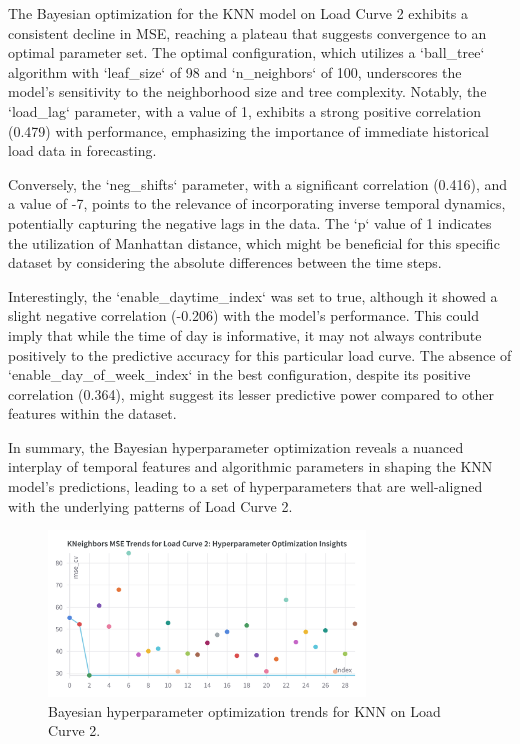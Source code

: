 \documentclass{article} %
\begin{document}
The Bayesian optimization for the \gls{KNN} model on Load Curve 2 exhibits a consistent decline in \gls{MSE}, reaching a plateau that suggests convergence to an optimal parameter set. The optimal configuration, which utilizes a `ball\_tree` algorithm with `leaf\_size` of 98 and `n\_neighbors` of 100, underscores the model's sensitivity to the neighborhood size and tree complexity. Notably, the `load\_lag` parameter, with a value of 1, exhibits a strong positive correlation (0.479) with performance, emphasizing the importance of immediate historical load data in forecasting.

Conversely, the `neg\_shifts` parameter, with a significant correlation (0.416), and a value of -7, points to the relevance of incorporating inverse temporal dynamics, potentially capturing the negative lags in the data. The `p` value of 1 indicates the utilization of Manhattan distance, which might be beneficial for this specific dataset by considering the absolute differences between the time steps.

Interestingly, the `enable\_daytime\_index` was set to true, although it showed a slight negative correlation (-0.206) with the model's performance. This could imply that while the time of day is informative, it may not always contribute positively to the predictive accuracy for this particular load curve. The absence of `enable\_day\_of\_week\_index` in the best configuration, despite its positive correlation (0.364), might suggest its lesser predictive power compared to other features within the dataset.

In summary, the Bayesian hyperparameter optimization reveals a nuanced interplay of temporal features and algorithmic parameters in shaping the \gls{KNN} model's predictions, leading to a set of hyperparameters that are well-aligned with the underlying patterns of Load Curve 2.

\begin{figure}[H]
    \centering
    \includegraphics[width=0.75\textwidth]{ressources/Hyperparams/KNN/KNeighbors MSE Trends for Load Curve 2 Hyperparameter Optimization Insights.png}
    \caption{Bayesian hyperparameter optimization trends for KNN on Load Curve 2.}
    \label{fig:knn_lc2}
\end{figure}
\end{document}
